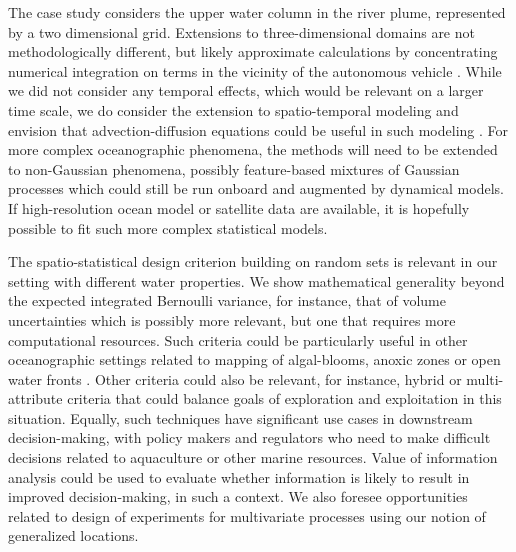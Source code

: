 \documentclass[aoas]{imsart}
\begin{document}
The case study considers the upper water column in the river plume,
represented by a two dimensional grid. Extensions to three-dimensional
domains are not methodologically different, but likely approximate
calculations by concentrating numerical integration on terms in the
vicinity of the autonomous vehicle \citep{fossum18b}. While we did not
consider any temporal effects, which would be relevant on a larger
time scale, we do consider the extension to spatio-temporal modeling
and envision that advection-diffusion equations could be useful in
such modeling
\citep{sigrist2015stochastic,richardson2017sparsity}. For more complex
oceanographic phenomena, the methods will need to be extended to
non-Gaussian phenomena, possibly feature-based mixtures of Gaussian
processes which could still be run onboard and augmented by dynamical
models. If high-resolution ocean model or satellite data are
available, it is hopefully possible to fit such more complex
statistical models. 

The spatio-statistical design criterion building on random sets is
relevant in our setting with different water properties.  We show
mathematical generality beyond the expected integrated Bernoulli
variance, for instance, that of volume uncertainties which is possibly
more relevant, but one that requires more computational resources.
Such criteria could be particularly useful in other oceanographic
settings related to mapping of algal-blooms, anoxic zones or open
water fronts \cite{costa19}.  Other criteria could also be relevant,
for instance, hybrid or multi-attribute criteria that could balance
goals of exploration and exploitation in this situation. Equally, such
techniques have significant use cases in downstream decision-making,
with policy makers and regulators who need to make difficult decisions
related to aquaculture or other marine resources. Value of information
analysis \citep{Eidsvik:15} could be used to evaluate whether
information is likely to result in improved decision-making, in such a
context.  We also foresee opportunities related to design of
experiments for multivariate processes using our notion of generalized
locations.
\end{document}
